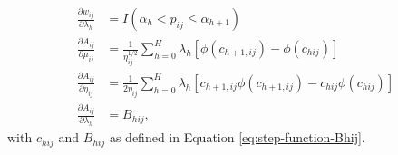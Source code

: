 \documentclass[
  man, donotrepeattitle,floatsintext]{apa7}
\begin{document}
\begin{align}
\frac{\partial w_{ij}}{\partial \lambda_h} &= I\left(\alpha_h < p_{ij} \leq \alpha_{h+1}\right) \\
\label{eq:step-function-dAdmu}
\frac{\partial A_{ij}}{\partial \mu_{ij}} &= \frac{1}{\eta_{ij}^{1/2}} \sum_{h=0}^H \lambda_h \left[\phi\left(c_{h+1,ij}\right) - \phi\left(c_{hij}\right)\right] \\
\label{eq:step-function-dAdeta}
\frac{\partial A_{ij}}{\partial \eta_{ij}} &= \frac{1}{2\eta_{ij}} \sum_{h=0}^H \lambda_h \left[c_{h+1,ij} \phi\left(c_{h+1,ij}\right) - c_{hij} \phi\left(c_{hij}\right)\right] \\
\label{eq:step-function-dAdlambda}
\frac{\partial A_{ij}}{\partial \lambda_h} &= B_{hij},
\end{align}
with \(c_{hij}\) and \(B_{hij}\) as defined in Equation \eqref{eq:step-function-Bhij}.
\end{document}
